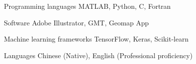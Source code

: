 

\begin{cvskills}

  \cvskill
    {Programming languages} %
    {MATLAB, Python, C, Fortran} %

  \cvskill
    {Software} %
    {Adobe Illustrator, GMT, Geomap App} %

  \cvskill
    {Machine learning frameworks} %
    {TensorFlow, Keras, Scikit-learn} %

  \cvskill
    {Languages} %
    {Chinese (Native), English (Professional proficiency)} %

\end{cvskills}
